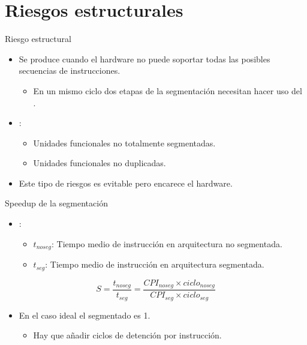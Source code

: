 \section{Riesgos estructurales}

\begin{frame}[t]{Riesgo estructural}
\begin{itemize}
  \item  Se produce cuando el hardware \alert{no puede} soportar
         todas las posibles secuencias de instrucciones.
    \begin{itemize} 
      \item En un mismo ciclo dos etapas de la segmentación
            necesitan hacer uso del .
    \end{itemize}

  \item {}:
    \begin{itemize}
      \item Unidades funcionales no totalmente segmentadas.
      \item Unidades funcionales no duplicadas.
    \end{itemize}

  \item Este tipo de riesgos es evitable pero encarece el
        hardware.
\end{itemize}
\end{frame}

\begin{frame}[t]{Speedup de la segmentación}
\begin{itemize}
  \item {}:
    \begin{itemize}
      \item $t_{noseg}$: Tiempo medio de instrucción en arquitectura no segmentada.
      \item $t_{seg}$: Tiempo medio de instrucción en arquitectura segmentada.
    \end{itemize}
\end{itemize}
\[
S = 
\frac{t_{noseg}}{t_{seg}} =
\frac{CPI_{noseg} \times ciclo_{noseg}}{CPI_{seg} \times ciclo_{seg}}
\]
\begin{itemize}
  \item En el caso ideal el  segmentado es 1.
    \begin{itemize}
      \item Hay que añadir ciclos de detención por instrucción.
    \end{itemize}
\end{itemize}
\end{frame}

